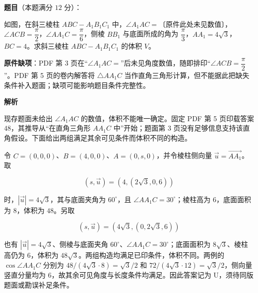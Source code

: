 \begin{answer}

\textbf{题目}（本题满分 $12$ 分）：

如图，在斜三棱柱 $ABC-A_1B_1C_1$ 中，$\angle A_1AC=$〔原件此处未见数值〕，$\angle ACB=\dfrac{\pi}{2}$，$\angle AA_1C=\dfrac{\pi}{6}$，侧棱 $BB_1$ 与底面所成的角为 $\dfrac{\pi}{3}$，$AA_1=4\sqrt3$，$BC=4$。求斜三棱柱 $ABC-A_1B_1C_1$ 的体积 $V$。
\nopagebreak[4]
\begin{center}\end{center}
\nopagebreak[4]
\begin{gktip}
\textbf{原件缺项}：PDF 第 3 页在“$\angle A_1AC=$”后未见角度数值，随即排印“$\angle ACB=\dfrac{\pi}{2}$”。PDF 第 5 页的卷内解答将 $\triangle AA_1C$ 当作直角三角形计算，但不能据此把缺失条件补入题面；缺项可能影响题目条件完整性。
\end{gktip}

\textbf{解析}

现存题面未给出 $\angle A_1AC$ 的数值，体积不能唯一确定。固定 PDF 第 5 页印载答案 $48$，其推导从“在直角三角形 $AA_1C$ 中”开始；题面第 3 页没有足够信息支持该直角假设。下面给出两组满足其余可见条件而体积不同的构造。

令 $C=(0,0,0)$、$B=(4,0,0)$、$A=(0,s,0)$，并令棱柱侧向量 $\vec u=\overrightarrow{AA_1}$。取

\nopagebreak[4]
\[
(s,\vec u)=(4,(2\sqrt3,0,6))
\]

时，$|\vec u|=4\sqrt3$，其与底面夹角为 $60^\circ$，且 $\angle AA_1C=30^\circ$；棱柱高为 $6$，底面面积为 $8$，体积为 $48$。另取

\nopagebreak[4]
\[
(s,\vec u)=(4\sqrt3,(0,2\sqrt3,6))
\]

也有 $|\vec u|=4\sqrt3$、侧棱与底面夹角 $60^\circ$、$\angle AA_1C=30^\circ$；底面面积为 $8\sqrt3$、棱柱高仍为 $6$，体积为 $48\sqrt3$。两组构造均满足已印条件，体积不同。两例的 $\cos\angle AA_1C$ 分别为 $48/(4\sqrt3\cdot8)=\sqrt3/2$ 和 $72/(4\sqrt3\cdot12)=\sqrt3/2$，侧向量竖直分量均为 $6$，故其余可见角度与长度条件均满足。因此答案记为 U，须待同版题面或勘误补足条件。


\end{answer}
